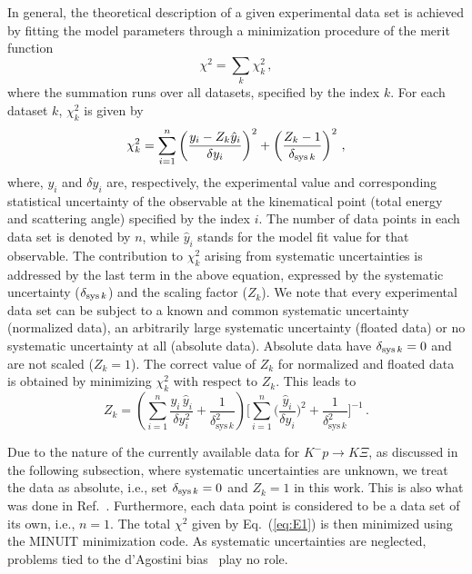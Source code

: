 \documentclass[10pt,aps,prc,superscriptaddress,twoside,twocolumn,nofootinbib,showpacs,preprintnumbers]{revtex4-1}
\begin{document}
In general, the theoretical description of a given experimental data set is achieved by fitting the model parameters through a minimization procedure of the 
merit function 
\begin{equation}
\chi^2 = \sum_{k} \chi^2_k\,, 
\label{eq:E1}
\end{equation}
where the summation runs over all datasets, specified by the index $k$. For each dataset $k$, $\chi^2_k$ is given by  
%
\begin{equation}
\chi^2_k = \sum_{i=1}^n \left(\frac{y_i - Z_k\hat y_i}{\delta y_i} \right)^2 
+ \left(\frac{Z_k - 1}{\delta_{{\rm sys}\, k}} \right)^2\,,
\label{eq:E1a}
\end{equation}
%
where, $y_i$ and $\delta y_i$ are, respectively, the experimental value and corresponding statistical uncertainty of the observable at the kinematical point (total energy and scattering angle) specified by the index $i$. The number of data points in each data set is denoted by $n$, while $\hat y_i$ stands for the model fit value for that observable. The contribution to $\chi^2_k$ arising from systematic uncertainties is addressed by the last term in the above equation, expressed by the systematic uncertainty ($\delta_{{\rm sys}\, k}$) and the scaling factor ($Z_k$). 
 We note that every experimental data set can be subject to a known and common systematic uncertainty (normalized data), an arbitrarily large systematic uncertainty (floated data) or no systematic uncertainty at all (absolute data). 
Absolute data have $\delta_{{\rm sys}\, k} = 0$ and are not scaled ($Z_k = 1$). The correct value of $Z_k$ for normalized and floated data is obtained by minimizing $\chi^2_k$ with respect to $Z_k$. This leads to 
\begin{equation}
Z_k = 
\left(
\sum_{i=1}^n \frac{y_i\, \hat y_i}{\delta y_i^2} + \frac{1}{\delta_{\text{sys}\, k}^2} 
\right)    
\Bigg[ 
\sum_{i=1}^n \Bigg(\frac{\hat y_i}{\delta y_i}\Bigg)^2 + \frac{1}{\delta^2_{\text{sys}\, k}} \Bigg]^{-1}\,.
\label{eq:E2}
\end{equation}

Due to the nature of the currently available data for $K^-p \to K \Xi$, as discussed in the following subsection, where systematic uncertainties are unknown, we treat the data as absolute, i.e., set $\delta_{{\rm sys}\, k}=0$ and $Z_k=1$ in this work. This is also what was done in Ref.~\cite{Jackson:2015dva}. Furthermore, each data point is considered to be a data set of its own, i.e., $n=1$.
The total $\chi^2$ given by Eq.~(\ref{eq:E1}) is then minimized using the MINUIT minimization code.  
As systematic uncertainties are neglected, problems tied to the d'Agostini bias~\cite{DAgostini:1993arp, Ball:2009qv} play no role.
\end{document}
